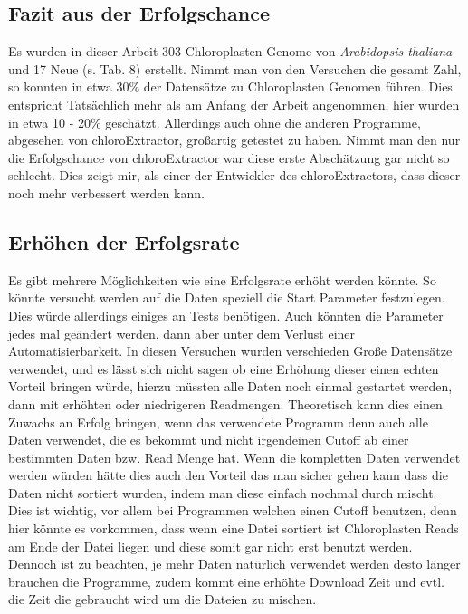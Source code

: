 \documentclass{scrartcl}
\begin{document}
\subsection{Fazit aus der Erfolgschance}
\label{sec-5-3}
Es wurden in dieser Arbeit 303 Chloroplasten Genome von \emph{Arabidopsis thaliana} und 17 Neue (s. Tab. 8) erstellt. Nimmt man von den Versuchen die gesamt Zahl, so konnten in etwa 30\% der Datensätze zu Chloroplasten Genomen führen.
Dies entspricht Tatsächlich mehr als am Anfang der Arbeit angenommen, hier wurden in etwa 10 - 20\% geschätzt. Allerdings auch ohne die anderen Programme, abgesehen von chloroExtractor, großartig getestet zu haben. Nimmt man 
den nur die Erfolgschance von chloroExtractor war diese erste Abschätzung gar nicht so schlecht. Dies zeigt mir, als einer der Entwickler des chloroExtractors, dass dieser noch mehr verbessert werden kann.  
\subsection{Erhöhen der Erfolgsrate}
\label{sec-5-4}
Es gibt mehrere Möglichkeiten wie eine Erfolgsrate erhöht werden könnte. So könnte versucht werden auf die Daten speziell die Start Parameter festzulegen. Dies würde allerdings einiges an Tests benötigen. 
Auch könnten die Parameter jedes mal 
geändert werden, dann aber unter dem Verlust einer Automatisierbarkeit. In diesen Versuchen wurden verschieden Große Datensätze verwendet, und es lässt sich nicht sagen ob eine Erhöhung dieser einen echten Vorteil bringen würde, 
hierzu müssten alle Daten noch einmal gestartet werden, dann mit erhöhten oder niedrigeren Readmengen. Theoretisch kann dies einen Zuwachs an Erfolg bringen, wenn das verwendete Programm denn auch alle Daten verwendet, 
die es bekommt und nicht
irgendeinen Cutoff ab einer bestimmten Daten bzw. Read Menge hat. Wenn die kompletten Daten verwendet werden würden hätte dies auch den Vorteil das man sicher gehen kann dass die Daten nicht sortiert wurden, indem man diese
einfach nochmal durch mischt. Dies ist wichtig, vor allem bei Programmen welchen einen Cutoff benutzen, denn hier könnte es vorkommen, dass wenn eine Datei sortiert ist Chloroplasten Reads am Ende der Datei liegen und diese somit
gar nicht erst benutzt werden. Dennoch ist zu beachten, je mehr Daten natürlich verwendet werden desto länger brauchen die Programme, zudem kommt eine erhöhte Download Zeit und evtl. die Zeit die gebraucht wird um die Dateien zu 
mischen. 
\end{document}
